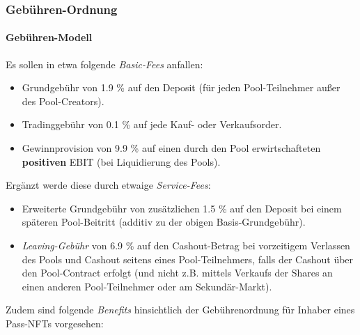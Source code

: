 \subsubsection{Gebühren-Ordnung}
\label{sec:fees}
\vspace{0.2cm}

\paragraph{Gebühren-Modell}
\textbf{ }
\vspace{0.2cm}

\begin{Assumption}[Gebühren]\label{fees}

Es sollen in etwa folgende \textit{Basic-Fees} anfallen:

\begin{itemize}
	\item Grundgebühr von 1.9 \% auf den Deposit (für jeden Pool-Teilnehmer außer des Pool-Creators).
	\item Tradinggebühr von 0.1 \% auf jede Kauf- oder Verkaufsorder.
	\item Gewinnprovision von 9.9 \% auf einen durch den Pool erwirtschafteten \textbf{positiven} EBIT (bei Liquidierung des Pools).
\end{itemize}

\vspace{0.2cm}

Ergänzt werde diese durch etwaige \textit{Service-Fees}: 

\begin{itemize}
	\item Erweiterte Grundgebühr von zusätzlichen 1.5 \% auf den Deposit bei einem späteren Pool-Beitritt (additiv zu der obigen Basis-Grundgebühr).
	\item \textit{Leaving-Gebühr} von 6.9 \% auf den Cashout-Betrag bei vorzeitigem Verlassen des Pools und Cashout seitens eines Pool-Teilnehmers, falls der Cashout über den Pool-Contract erfolgt (und nicht z.B. mittels Verkaufs der Shares an einen anderen Pool-Teilnehmer oder am Sekundär-Markt).
\end{itemize}

\vspace{0.2cm}

Zudem sind folgende \textit{Benefits} hinsichtlich der Gebührenordnung für Inhaber eines Pass-NFTs  vorgesehen:


\end{Assumption}
